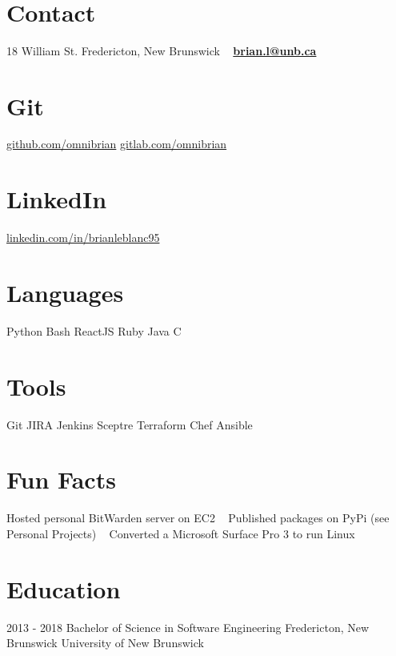 \documentclass[a4paper]{resume}
\begin{document}


\begin{aside}
    ~
    ~
    ~
    ~
    ~
  \section{Contact}
    18 William St.
    Fredericton,
    New Brunswick
    ~
    \textbf{\href{mailto:brian.l@unb.ca}{brian.l@unb.ca}}
    ~
  \section{Git}
    \href{https://github.com/omnibrian}{github.com/omnibrian}
    \href{https://gitlab.com/omnibrian}{gitlab.com/omnibrian}
    ~
  \section{LinkedIn}
    \href{https://www.linkedin.com/in/brianleblanc95/}{linkedin.com/in/brianleblanc95}
    ~
  \section{Languages}
    Python
    Bash
    ReactJS
    Ruby
    Java
    C
    ~
  \section{Tools}
    Git
    JIRA
    Jenkins
    Sceptre
    Terraform
    Chef
    Ansible
    ~
  \section{Fun Facts}
    Hosted personal BitWarden server on EC2
    ~
    Published packages on PyPi (see Personal Projects)
    ~
    Converted a Microsoft Surface Pro 3 to run Linux
    ~
\end{aside}

\section{Education}
\begin{entrylist}
  \entry
    {2013 - 2018}
    {Bachelor of Science in Software Engineering}
    {Fredericton, New Brunswick}
    {University of New Brunswick}
\end{entrylist}
\end{document}
